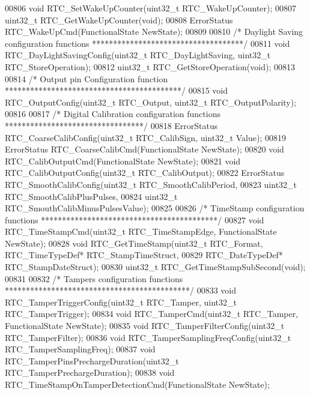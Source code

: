 \begin{DoxyCode}
00806 \textcolor{keywordtype}{void} RTC_SetWakeUpCounter(uint32\_t RTC\_WakeUpCounter);
00807 uint32\_t RTC_GetWakeUpCounter(\textcolor{keywordtype}{void});
00808 ErrorStatus RTC_WakeUpCmd(FunctionalState NewState);
00809 
00810 \textcolor{comment}{/* Daylight Saving configuration functions ************************************/}
00811 \textcolor{keywordtype}{void} RTC_DayLightSavingConfig(uint32\_t RTC\_DayLightSaving, uint32\_t RTC\_StoreOperation);
00812 uint32\_t RTC_GetStoreOperation(\textcolor{keywordtype}{void});
00813 
00814 \textcolor{comment}{/* Output pin Configuration function ******************************************/}
00815 \textcolor{keywordtype}{void} RTC_OutputConfig(uint32\_t RTC\_Output, uint32\_t RTC\_OutputPolarity);
00816 
00817 \textcolor{comment}{/* Digital Calibration configuration functions *********************************/}
00818 ErrorStatus RTC_CoarseCalibConfig(uint32\_t RTC\_CalibSign, uint32\_t Value);
00819 ErrorStatus RTC_CoarseCalibCmd(FunctionalState NewState);
00820 \textcolor{keywordtype}{void} RTC_CalibOutputCmd(FunctionalState NewState);
00821 \textcolor{keywordtype}{void} RTC_CalibOutputConfig(uint32\_t RTC\_CalibOutput);
00822 ErrorStatus RTC_SmoothCalibConfig(uint32\_t RTC\_SmoothCalibPeriod,
00823                                   uint32\_t RTC\_SmoothCalibPlusPulses,
00824                                   uint32\_t RTC\_SmouthCalibMinusPulsesValue);
00825 
00826 \textcolor{comment}{/* TimeStamp configuration functions ******************************************/}
00827 \textcolor{keywordtype}{void} RTC_TimeStampCmd(uint32\_t RTC\_TimeStampEdge, FunctionalState NewState);
00828 \textcolor{keywordtype}{void} RTC_GetTimeStamp(uint32\_t RTC\_Format, RTC\_TimeTypeDef* RTC\_StampTimeStruct,
00829                                       RTC\_DateTypeDef* RTC\_StampDateStruct);
00830 uint32\_t RTC_GetTimeStampSubSecond(\textcolor{keywordtype}{void});
00831 
00832 \textcolor{comment}{/* Tampers configuration functions ********************************************/}
00833 \textcolor{keywordtype}{void} RTC_TamperTriggerConfig(uint32\_t RTC\_Tamper, uint32\_t RTC\_TamperTrigger);
00834 \textcolor{keywordtype}{void} RTC_TamperCmd(uint32\_t RTC\_Tamper, FunctionalState NewState);
00835 \textcolor{keywordtype}{void} RTC_TamperFilterConfig(uint32\_t RTC\_TamperFilter);
00836 \textcolor{keywordtype}{void} RTC_TamperSamplingFreqConfig(uint32\_t RTC\_TamperSamplingFreq);
00837 \textcolor{keywordtype}{void} RTC_TamperPinsPrechargeDuration(uint32\_t RTC\_TamperPrechargeDuration);
00838 \textcolor{keywordtype}{void} RTC_TimeStampOnTamperDetectionCmd(FunctionalState NewState);

\end{DoxyCode}
